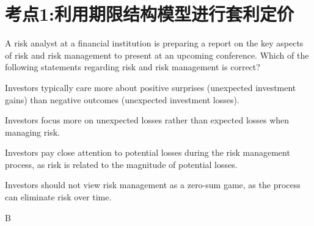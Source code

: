 \documentclass{article}
\newcounter{question} %
\begin{document}
 \tableofcontents %
\newpage




\section{考点1:利用期限结构模型进行套利定价}
\setcounter{question}{0}


\begin{question}
    A risk analyst at a financial institution is preparing a report on the key aspects of risk and risk management to present at an upcoming conference. Which of the following statements regarding risk and risk management is correct?
\end{question}

\begin{choices}
    \item Investors typically care more about positive surprises (unexpected investment gains) than negative outcomes (unexpected investment losses).
    
    \item Investors focus more on unexpected losses rather than expected losses when managing risk.
    
    \item Investors pay close attention to potential losses during the risk management process, as risk is related to the magnitude of potential losses.
    
    \item Investors should not view risk management as a zero-sum game, as the process can eliminate risk over time.
\end{choices}

\begin{correctanswer}
    B
\end{correctanswer}
\end{document}

